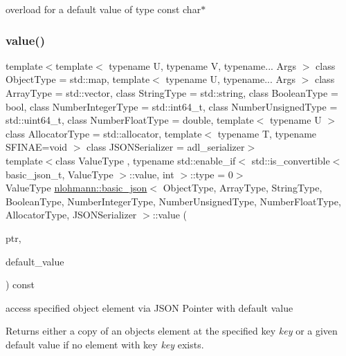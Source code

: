 overload for a default value of type const char$\ast$ 

\mbox{\label{classnlohmann_1_1basic__json_a671aea68432ecb28770bbc482918f023}} 
\subsubsection{\texorpdfstring{value()}{value()}\hspace{0.1cm}{\footnotesize\ttfamily [3/4]}}
{\footnotesize\ttfamily template$<$template$<$ typename U, typename V, typename... Args $>$ class Object\+Type = std\+::map, template$<$ typename U, typename... Args $>$ class Array\+Type = std\+::vector, class String\+Type  = std\+::string, class Boolean\+Type  = bool, class Number\+Integer\+Type  = std\+::int64\+\_\+t, class Number\+Unsigned\+Type  = std\+::uint64\+\_\+t, class Number\+Float\+Type  = double, template$<$ typename U $>$ class Allocator\+Type = std\+::allocator, template$<$ typename T, typename S\+F\+I\+N\+A\+E=void $>$ class J\+S\+O\+N\+Serializer = adl\+\_\+serializer$>$ \\
template$<$class Value\+Type , typename std\+::enable\+\_\+if$<$ std\+::is\+\_\+convertible$<$ basic\+\_\+json\+\_\+t, Value\+Type $>$\+::value, int $>$\+::type  = 0$>$ \\
Value\+Type \mbox{\hyperlink{classnlohmann_1_1basic__json}{nlohmann\+::basic\+\_\+json}}$<$ Object\+Type, Array\+Type, String\+Type, Boolean\+Type, Number\+Integer\+Type, Number\+Unsigned\+Type, Number\+Float\+Type, Allocator\+Type, J\+S\+O\+N\+Serializer $>$\+::value (\begin{DoxyParamCaption}\item[{const \mbox{\hyperlink{classnlohmann_1_1json__pointer}{json\+\_\+pointer}} \&}]{ptr,  }\item[{const Value\+Type \&}]{default\+\_\+value }\end{DoxyParamCaption}) const\hspace{0.3cm}{\ttfamily [inline]}}



access specified object element via J\+S\+ON Pointer with default value 

Returns either a copy of an object\textquotesingle{}s element at the specified key {\itshape key} or a given default value if no element with key {\itshape key} exists.

